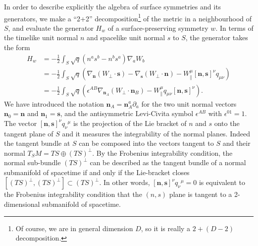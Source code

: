 \documentclass[a4paper,11pt]{article}
\def\n{\bm{n}}
\def\s{\bm{s}}
\def\pa{\partial}
\begin{document}
 In order to describe explicitly the algebra of surface symmetries and its generators, we make a ``2+2'' decomposition\footnote{Of course, we are in general dimension $D$, so it is really a $2 + (D-2)$ decomposition.} of the metric in a neighbourhood of $S$, and evaluate the generator $H_w$ of a surface-preserving symmetry $w$.
In terms of the timelike unit normal $n$ and spacelike unit normal $s$ to $S$, the generator takes the form
\begin{align}
H_w &= -\frac12 \int_S \sqrt{q} (n^a s^b - n^b s^a) \nabla_a W_b \nonumber \\
&= -\frac12 \int_{S} \sqrt{q}\left( \nabla_{\n}({W}_\perp\!\cdot\!\s)- \nabla_{\s}({W}_\perp\!\cdot\!\n) -{W}^\mu_{\parallel } [\n,\s]^\nu q_{\mu \nu}\right) \nonumber \\
&= -\frac12 \int_{S} \sqrt{q}\left(\epsilon^{AB} \nabla_{\n_A}({W}_\perp\!\cdot\!\n_B) -{W}^\mu_{\parallel } q_{\mu \nu}  [{\n},\s]^\nu \right). \label{HV}
\end{align}
We have introduced the notation $\n_A =\n_A^a \pa_a$ for the two unit normal vectors $\n_0 = \n$ and $\n_1 = \s$, and the antisymmetric Levi-Civita symbol $\epsilon^{AB}$ with $\epsilon^{01} = 1$.
The vector $ [\n, \s]^\nu q_{\nu}{}^\mu$ is the projection of the Lie bracket of $n$ and $s$ onto the tangent plane of $S$ and it measures the integrability of the normal planes. 
Indeed the tangent bundle  at $S$ can be composed into the vectors tangent to $S$ and their normal $T_S M= TS \oplus (TS)^\perp$. By the Frobenius integrability condition, the normal sub-bundle $(TS)^\perp$ can be described as the tangent bundle of a normal submanifold of spacetime if and only if the Lie-bracket closes $[(TS)^\perp,(TS)^\perp]\subset (TS)^\perp$. In other words,  $[\n, \s]^\nu q_{\nu}{}^\mu=0$ is equivalent to the Frobenius integrability condition that the $(n,s)$ plane is tangent to a 2-dimensional submanifold of spacetime.
\end{document}
